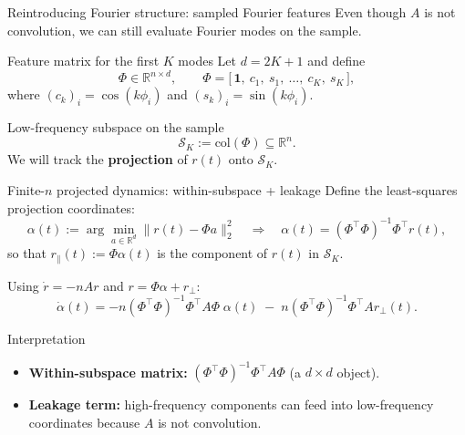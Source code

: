 \documentclass[10pt,aspectratio=169]{beamer}
\newcommand{\R}{\mathbb{R}}
\begin{document}
\begin{frame}{Reintroducing Fourier structure: sampled Fourier features}
	\small
	Even though $A$ is not convolution, we can still evaluate Fourier modes on the sample.

	\begin{block}{Feature matrix for the first $K$ modes}
		Let $d=2K+1$ and define
		\[
			\Phi \in \R^{n\times d},\qquad
			\Phi = \big[\,\mathbf{1},\ c_1,\ s_1,\ \dots,\ c_K,\ s_K\,\big],
		\]
		where $(c_k)_i=\cos(k\phi_i)$ and $(s_k)_i=\sin(k\phi_i)$.
	\end{block}

	\begin{block}{Low-frequency subspace on the sample}
		\[
			\mathcal S_K := \mathrm{col}(\Phi)\subseteq\R^n.
		\]
		We will track the \textbf{projection} of $r(t)$ onto $\mathcal S_K$.
	\end{block}

\end{frame}

\begin{frame}{Finite-$n$ projected dynamics: within-subspace + leakage}
	\small
	Define the least-squares projection coordinates:
	\[
		\alpha(t):=\arg\min_{a\in\R^d}\|r(t)-\Phi a\|_2^2
		\quad\Rightarrow\quad
		\alpha(t)=(\Phi^\top\Phi)^{-1}\Phi^\top r(t),
	\]
	so that $r_\parallel(t):=\Phi\alpha(t)$ is the component of $r(t)$ in $\mathcal S_K$.

	Using $\dot r=-nA r$ and $r=\Phi\alpha+r_\perp$:
	\[
		\boxed{
			\dot\alpha(t)
			= -n(\Phi^\top\Phi)^{-1}\Phi^\top A\Phi\;\alpha(t)
			\;-\;n(\Phi^\top\Phi)^{-1}\Phi^\top A r_\perp(t).
		}
	\]

	\begin{block}{Interpretation}
		\begin{itemize}
			\item \textbf{Within-subspace matrix:} $(\Phi^\top\Phi)^{-1}\Phi^\top A\Phi$ (a $d\times d$ object).
			\item \textbf{Leakage term:} high-frequency components can feed into low-frequency coordinates because $A$ is not convolution.
		\end{itemize}
	\end{block}

\end{frame}
\end{document}
